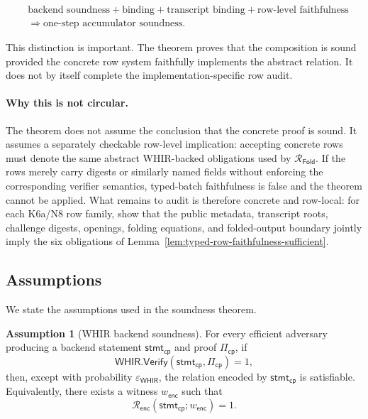 \documentclass[11pt]{article}
\theoremstyle{definition}
\newtheorem{assumption}[theorem]{Assumption}
\newcommand{\WHIR}{\mathsf{WHIR}}
\newcommand{\Verify}{\mathsf{Verify}}
\newcommand{\Rfold}{\mathcal{R}_{\mathsf{Fold}}}
\newcommand{\Renc}{\mathcal{R}_{\mathsf{enc}}}
\begin{document}
\[
  \begin{aligned}
    &\text{backend soundness}
    + \text{binding}
    + \text{transcript binding}
    + \text{row-level faithfulness}
    \\
    &\Longrightarrow
    \text{one-step accumulator soundness}.
  \end{aligned}
\]

This distinction is important. The theorem proves that the composition is sound
provided the concrete row system faithfully implements the abstract relation. It
does not by itself complete the implementation-specific row audit.

\paragraph{Why this is not circular.}
The theorem does not assume the conclusion that the concrete proof is sound. It
assumes a separately checkable row-level implication: accepting concrete rows
must denote the same abstract WHIR-backed obligations used by \(\Rfold\). If the
rows merely carry digests or similarly named fields without enforcing the
corresponding verifier semantics, typed-batch faithfulness is false and the
theorem cannot be applied. What remains to audit is therefore concrete and
row-local: for each K6a/N8 row family, show that the public metadata, transcript
roots, challenge digests, openings, folding equations, and folded-output boundary
jointly imply the six obligations of
Lemma~\ref{lem:typed-row-faithfulness-sufficient}.

\subsection{Assumptions}
\label{sec:soundness-assumptions}

We state the assumptions used in the soundness theorem.

\begin{assumption}[WHIR backend soundness]
\label{assump:whir-backend-soundness}
For every efficient adversary producing a backend statement
\(\mathsf{stmt}_{\mathsf{cp}}\) and proof \(\Pi_{\mathsf{cp}}\), if
\[
  \WHIR.\Verify(\mathsf{stmt}_{\mathsf{cp}},\Pi_{\mathsf{cp}})=1,
\]
then, except with probability \(\varepsilon_{\WHIR}\), the relation encoded by
\(\mathsf{stmt}_{\mathsf{cp}}\) is satisfiable. Equivalently, there exists a
witness \(w_{\mathsf{enc}}\) such that
\[
  \Renc(\mathsf{stmt}_{\mathsf{cp}};w_{\mathsf{enc}})=1.
\]
\end{assumption}
\end{document}
